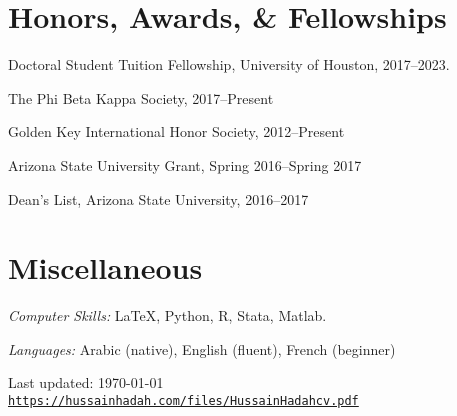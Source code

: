 \documentclass[10pt,letterpaper]{article}
\def\footerlink{https://hussainhadah.com/files/HussainHadahcv.pdf}
\renewenvironment{itemize}{
  \begin{list}{}{
    \setlength{\leftmargin}{1.5em}
  }
}{
  \end{list}
}
\begin{document}
\section*{Honors, Awards, \& Fellowships}
%
\begin{itemize}
\item Doctoral Student Tuition Fellowship, University of Houston, 2017--2023.
\item The Phi Beta Kappa Society, 2017--Present
\item Golden Key International Honor Society, 2012--Present
\item Arizona State University Grant, Spring 2016--Spring 2017
\item Dean's List, Arizona State University, 2016--2017
\end{itemize}


\section*{Miscellaneous}
%
\begin{itemize}
\item \textit{Computer Skills:} \LaTeX, Python, R, Stata, Matlab.
\item \textit{Languages:} Arabic (native), English (fluent), French (beginner)
\end{itemize}
%
%

\bigskip

\begin{center}
  \begin{footnotesize}
    Last updated: \today \\
    \href{\footerlink}{\texttt{\footerlink}}
  \end{footnotesize}
\end{center}
\end{document}
